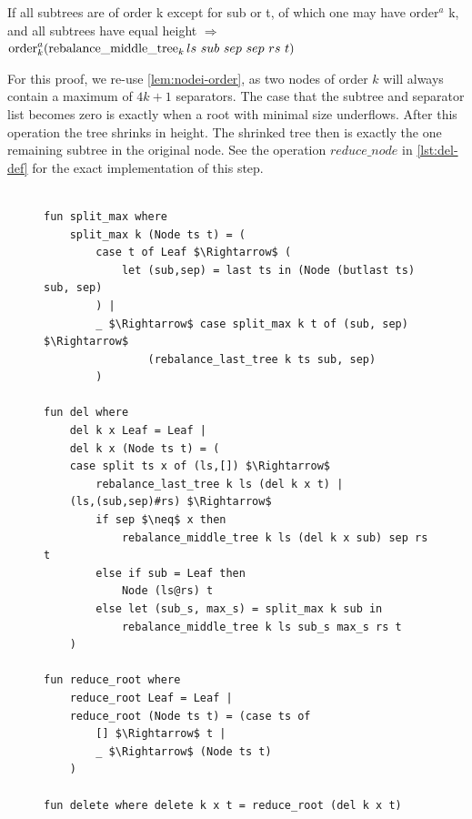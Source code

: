 \begin{lemma}
    If all subtrees are of order k except for sub or t, of which one may have order$^a$ k,
    and all subtrees have equal height $\Longrightarrow$
    $\order^a_k (\rebalancemt_k ls\ sub\ sep\ sep\ rs\ t)$
\end{lemma}

For this proof, we re-use \autoref{lem:nodei-order},
as two nodes of order $k$ will always contain
a maximum of $4k+1$ separators.
The case that the subtree and separator list becomes zero
is exactly when a root with minimal size underflows.
After this operation the tree shrinks in height.
The shrinked tree then is exactly the one remaining subtree in the original node.
See the operation $reduce\_node$ in \autoref{lst:del-def} for the exact implementation
of this step.

\begin{figure}
\begin{lstlisting}[mathescape=true, language=Isabelle,label={lst:del-def},
    caption={The $delete$ function}]

fun split_max where
    split_max k (Node ts t) = (
        case t of Leaf $\Rightarrow$ (
            let (sub,sep) = last ts in (Node (butlast ts) sub, sep)
        ) |
        _ $\Rightarrow$ case split_max k t of (sub, sep) $\Rightarrow$
                (rebalance_last_tree k ts sub, sep)
        )

fun del where
    del k x Leaf = Leaf |
    del k x (Node ts t) = (
    case split ts x of (ls,[]) $\Rightarrow$
        rebalance_last_tree k ls (del k x t) |
    (ls,(sub,sep)#rs) $\Rightarrow$
        if sep $\neq$ x then
            rebalance_middle_tree k ls (del k x sub) sep rs t
        else if sub = Leaf then
            Node (ls@rs) t
        else let (sub_s, max_s) = split_max k sub in
            rebalance_middle_tree k ls sub_s max_s rs t
    )
 
fun reduce_root where
    reduce_root Leaf = Leaf |
    reduce_root (Node ts t) = (case ts of
        [] $\Rightarrow$ t |
        _ $\Rightarrow$ (Node ts t)
    )
 
fun delete where delete k x t = reduce_root (del k x t)
\end{lstlisting}
\end{figure}

